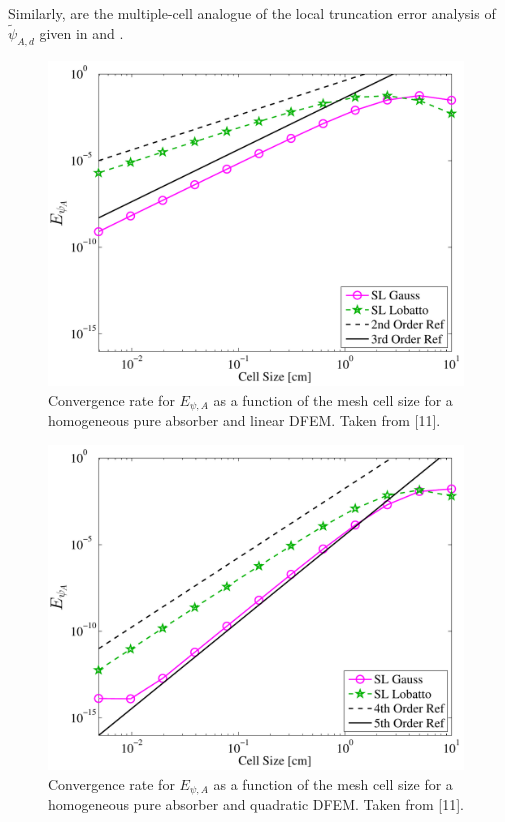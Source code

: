 Similarly,  are the multiple-cell analogue of the local truncation error analysis of $\widetilde{\psi}_{A,d}$ given in  and .  
\begin{figure}[!hbp]
\centering
\includegraphics[width=11cm]{chapter2_constant_xs/Linear_L2A_err-eps-converted-to.pdf}
\caption{Convergence rate for $E_{\psi,A}$ as a function of the mesh cell size for a homogeneous pure absorber and linear DFEM.  Taken from [11].}
\label{fig:multi_L2A_p1}
\end{figure}
\begin{figure}[!htp]
\centering
\includegraphics[width=11cm]{chapter2_constant_xs/Quadratic_L2A_err-eps-converted-to.pdf}
\caption{Convergence rate for $E_{\psi,A}$ as a function of the mesh cell size for a homogeneous pure absorber and quadratic DFEM.  Taken from [11].}
\label{fig:multi_L2A_p2}
\end{figure}
